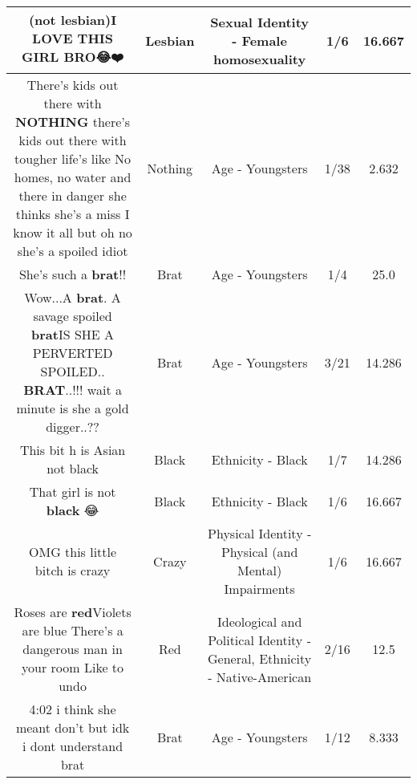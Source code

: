 \documentclass[11pt]{article}
\newlength\mylength
\begin{document}
\begin{center}
\begin{longtable}{|C{.65\mylength}|C{.30\mylength}|C{.12\mylength}|C{.12\mylength}|C{.12\mylength}|}
  \small (not \textbf{lesbian})I LOVE THIS GIRL BRO😂❤️\normalsize   & Lesbian & Sexual Identity - Female homosexuality & 1/6 & 16.667 \\  \hline
  \small There's kids out there with \textbf{NOTHING} there's kids out there with tougher life's like No homes, no water and there in danger she thinks she's a miss I know it all but oh no she's a spoiled idiot\normalsize   & Nothing & Age - Youngsters & 1/38 & 2.632 \\  \hline
  \small She's such a \textbf{brat}!!\normalsize   & Brat & Age - Youngsters & 1/4 & 25.0 \\  \hline
  \small Wow...A \textbf{brat}. A savage spoiled \textbf{brat}IS SHE A PERVERTED SPOILED.. \textbf{BRAT}..!!! wait a minute is she a gold digger..??\normalsize   & Brat & Age - Youngsters & 3/21 & 14.286 \\  \hline
  \small This bit h is Asian not black\normalsize   & Black & Ethnicity - Black & 1/7 & 14.286 \\  \hline
  \small That  girl is not \textbf{black} 😂\normalsize   & Black & Ethnicity - Black & 1/6 & 16.667 \\  \hline
  \small OMG this little bitch is crazy\normalsize   & Crazy & Physical Identity - Physical (and Mental) Impairments & 1/6 & 16.667 \\  \hline
  \small Roses are \textbf{r\textbf{ed}}Violets are blue There's a dangerous man in your room Like to undo\normalsize   & Red &  Ideological and Political Identity - General, Ethnicity - Native-American & 2/16 & 12.5 \\  \hline
  \small 4:02 i think she meant don't but idk i dont understand brat\normalsize   & Brat & Age - Youngsters & 1/12 & 8.333 \\  \hline

\end{longtable}
\end{center}
\end{document}
